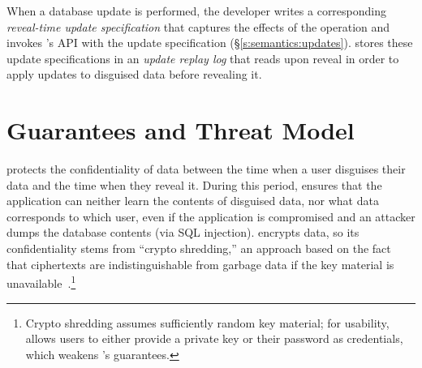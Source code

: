 When a database update is performed, the developer writes a corresponding
\emph{reveal-time update specification} that captures the effects of the
operation and invokes \sys's API with the update specification
(\S\ref{s:semantics:updates}). \sys stores
these update specifications in an \emph{update replay log} that \sys reads upon
reveal in order to apply updates to disguised data before revealing it.
%
%

%

\section{Guarantees and Threat Model}
\label{s:threat}
%
%
%
\sys protects the confidentiality of \xxed data between the time when a user
disguises their data and the time when they reveal it.
%
%
During this period, \sys ensures that the application can neither learn the contents of
disguised data, nor what \xxed data corresponds to which user, even if the
application is compromised and an attacker dumps the database contents (\eg via
SQL injection).
%
\sys encrypts \xxed data, so its confidentiality stems from ``crypto
shredding,'' an approach based on the fact that ciphertexts are
indistinguishable from garbage data if the key material is
unavailable~\cite{dnefs,townsend:cryptoshredding,aws:cryptoshredding,gtr:cryptoshredding}.\footnote{Crypto
shredding assumes sufficiently random key material; for usability, \sys allows 
users to either provide a private key or their password as credentials, which
weakens \sys's guarantees.}
%

